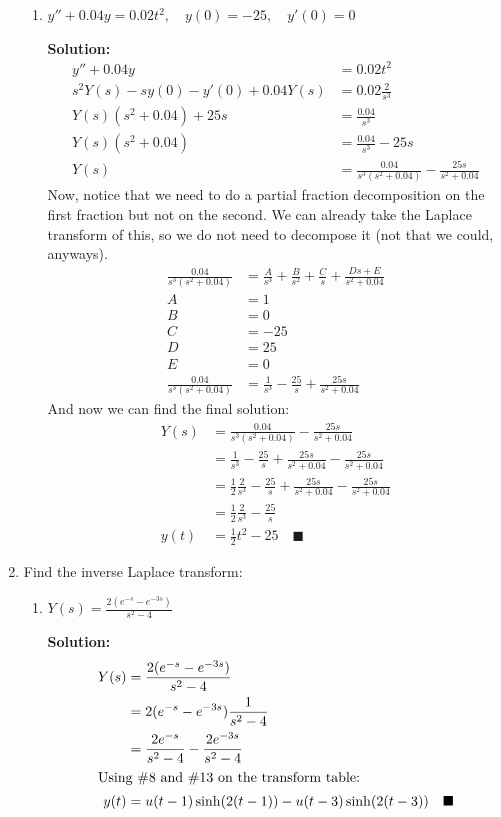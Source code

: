 \documentclass[letterpaper, fontsize=11pt]{scrartcl} %
\numberwithin{equation}{section} %
\numberwithin{figure}{section} %
\numberwithin{table}{section} %
\begin{document}
\begin{enumerate}
\begin{enumerate}
\item $y'' + 0.04y = 0.02t^2,\quad y(0) = -25,\quad y'(0) = 0$
\par \textbf{Solution:}
\begin{align*}
y'' + 0.04y &= 0.02t^2 \\
s^2Y(s) - sy(0) - y'(0) + 0.04Y(s) &= 0.02\frac{2}{s^3}\\
Y(s)(s^2 + 0.04) +25s &= \frac{0.04}{s^3}\\
Y(s)(s^2 + 0.04) &= \frac{0.04}{s^3}  - 25s\\
Y(s) &= \frac{0.04}{s^3(s^2 + 0.04)} -\frac{25s}{s^2 + 0.04}
\end{align*}
Now, notice that we need to do a partial fraction decomposition on the first fraction but not on the second. We can already take the Laplace transform of this, so we do not need to decompose it (not that we could, anyways). 
\begin{align*}
\frac{0.04}{s^3(s^2 + 0.04)} &= \frac{A}{s^3} + \frac{B}{s^2} + \frac{C}{s} + \frac{Ds + E}{s^2 + 0.04}\\
A&= 1\\
B&= 0\\
C&= -25\\
D&= 25\\
E&= 0\\
\frac{0.04}{s^3(s^2 + 0.04)} &= \frac{1}{s^3}  - \frac{25}{s} + \frac{25s}{s^2 + 0.04}
\end{align*}
And now we can find the final solution:
\begin{align*}
Y(s) &= \frac{0.04}{s^3(s^2 + 0.04)} -\frac{25s}{s^2 + 0.04}\\
&= \frac{1}{s^3}  - \frac{25}{s} + \frac{25s}{s^2 + 0.04} - \frac{25s}{s^2 + 0.04}\\
&= \frac{1}{2}\frac{2}{s^3}  - \frac{25}{s} + \frac{25s}{s^2 + 0.04} - \frac{25s}{s^2 + 0.04}\\
&= \frac{1}{2}\frac{2}{s^3}  - \frac{25}{s} \\
y(t)&= \frac{1}{2}t^2 - 25 \quad\blacksquare
\end{align*}

\end{enumerate}

\item Find the inverse Laplace transform:
\begin{enumerate}
\item $Y(s) = \frac{2(e^{-s} - e^{-3s})}{s^2 - 4}$
\par \textbf{Solution:}
\begin{align*}
Y(s) &= \frac{2(e^{-s} - e^{-3s})}{s^2 - 4}\\
&= 2(e^{-s} - e^{-3s})\frac{1}{s^2 - 4}\\
&= \frac{2e^{-s}}{s^2 -4} - \frac{2e^{-3s}}{s^2-4}\\
\intertext{Using \#8 and \#13 on the transform table:}
y(t) &= u(t-1)\sinh(2(t-1)) - u(t-3)\sinh(2(t-3))\quad\blacksquare
\end{align*}



\end{enumerate}
\end{enumerate}
\end{document}
